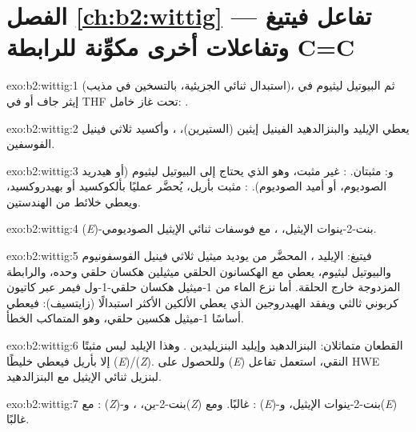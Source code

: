 \section*{الفصل \ref{ch:b2:wittig} --- تفاعل فيتيغ وتفاعلات أخرى مكوِّنة للرابطة C=C}

\begin{solution}{exo:b2:wittig:1}
 (استبدال ثنائي الجزيئية، بالتسخين في مذيب)، ثم
البيوتيل ليثيوم في إيثر جاف أو في THF تحت غاز خامل: .
\end{solution}

\begin{solution}{exo:b2:wittig:2}
يعطي الإيليد  والبنزالدهيد الفينيل إيثين (الستيرين)، ، 
وأكسيد ثلاثي فينيل الفوسفين.
\end{solution}

\begin{solution}{exo:b2:wittig:3}
 و: مثبتان. : غير مثبت، وهو الذي
يحتاج إلى البيوتيل ليثيوم (أو هيدريد الصوديوم، أو أميد الصوديوم). : مثبت بأريل، يُحضَّر عمليًا
بألكوكسيد أو بهيدروكسيد، ويعطي خلائط من الهندستين.
\end{solution}

\begin{solution}{exo:b2:wittig:4}
(\textit{E})-بنت-2-ينوات الإيثيل، ، مع فوسفات ثنائي الإيثيل الصوديومي.
\end{solution}

\begin{solution}{exo:b2:wittig:5}
فيتيغ: الإيليد ، المحضَّر من يوديد ميثيل ثلاثي فينيل الفوسفونيوم والبيوتيل ليثيوم، يعطي مع الهكسانون الحلقي
ميثيلين هكسان حلقي وحده، والرابطة المزدوجة خارج الحلقة. أما نزع الماء من 1-ميثيل هكسان حلقي-1-ول فيمر
عبر كاتيون كربوني ثالثي ويفقد الهيدروجين الذي يعطي الألكين الأكثر استبدالًا (زايتسيف):
فيعطي أساسًا 1-ميثيل هكسين حلقي، وهو المتماكب الخطأ.
\end{solution}

\begin{solution}{exo:b2:wittig:6}
القطعان متماثلان: البنزالدهيد وإيليد البنزيليدين . وهذا الإيليد ليس
مثبتًا إلا بأريل فيعطي خليطًا (\textit{E})/(\textit{Z}). وللحصول على (\textit{E}) النقي، استعمل تفاعل HWE
لبنزيل  ثنائي الإيثيل مع البنزالدهيد.
\end{solution}

\begin{solution}{exo:b2:wittig:7}
مع : (\textit{Z})-بنت-2-ين، ، و(\textit{Z}) غالبًا. ومع
: (\textit{E})-بنت-2-ينوات الإيثيل، و(\textit{E}) غالبًا.
\end{solution}

